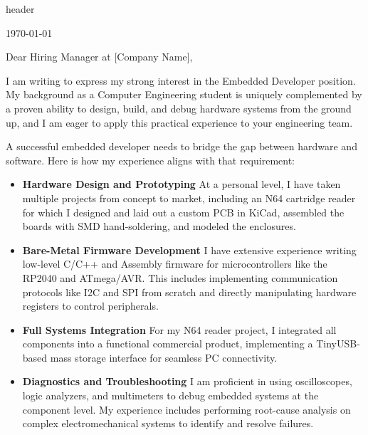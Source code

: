 
\newpage

{header}
\vspace{0.5cm}

\today

\vspace{0.6cm}

Dear Hiring Manager at [Company Name],

\vspace{0.4cm}

I am writing to express my strong interest in the Embedded Developer position. My background as a Computer Engineering student is uniquely complemented by a proven ability to design, build, and debug hardware systems from the ground up, and I am eager to apply this practical experience to your engineering team.

\vspace{0.2cm}
A successful embedded developer needs to bridge the gap between hardware and software. Here is how my experience aligns with that requirement:
\begin{itemize}[leftmargin=*, itemsep=0.5em]
  \item \textbf{Hardware Design and Prototyping}
    At a personal level, I have taken multiple projects from concept to market, including an N64 cartridge reader for which I designed and laid out a custom PCB in KiCad, assembled the boards with SMD hand-soldering, and modeled the enclosures.
    
  \item \textbf{Bare-Metal Firmware Development}
    I have extensive experience writing low-level C/C++ and Assembly firmware for microcontrollers like the RP2040 and ATmega/AVR. This includes implementing communication protocols like I2C and SPI from scratch and directly manipulating hardware registers to control peripherals.

  \item \textbf{Full Systems Integration}
    For my N64 reader project, I integrated all components into a functional commercial product, implementing a TinyUSB-based mass storage interface for seamless PC connectivity.

  \item \textbf{Diagnostics and Troubleshooting}
    I am proficient in using oscilloscopes, logic analyzers, and multimeters to debug embedded systems at the component level. My experience includes performing root-cause analysis on complex electromechanical systems to identify and resolve failures.
\end{itemize}

